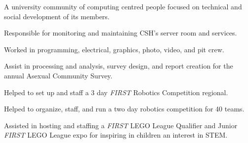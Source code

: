 \cvtag{\LaTeX}



\medskip
{}
A university community of computing centred people focused on technical and social development of its members.

Responsible for monitoring and maintaining CSH's server room and services.

\divider

Worked in programming, electrical, graphics, photo, video, and pit crew.



Assist in processing and analysis, survey design, and report creation for the annual Asexual Community Survey.


\divider

Helped to set up and staff a 3 day \textit{FIRST} Robotics Competition regional.

Helped to organize, staff, and run a two day robotics competition for 40 teams.

Assisted in hosting and staffing a \textit{FIRST} LEGO\textsuperscript{\textregistered} League Qualifier and Junior \textit{FIRST} LEGO League expo for inspiring in children an interest in STEM.
